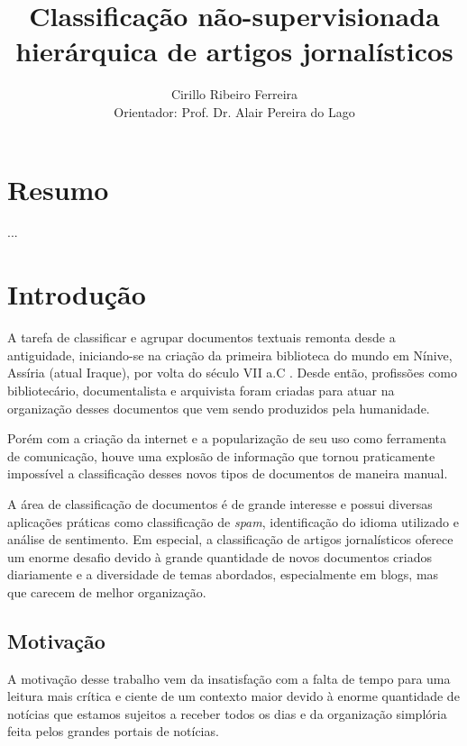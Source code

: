 \documentclass[a4paper,12pt]{article}
\title{Classificação não-supervisionada hierárquica de artigos jornalísticos}
\author{Cirillo Ribeiro Ferreira \\ Orientador: Prof. Dr. Alair Pereira do Lago}
\begin{document}
\maketitle
\newpage

\section*{Resumo}
...

\newpage

\tableofcontents
\newpage
\section {Introdução}
A tarefa de classificar e agrupar documentos textuais remonta desde a antiguidade, iniciando-se na criação da primeira biblioteca do mundo em Nínive, Assíria (atual Iraque), por volta do século VII a.C \cite{redarterj}. Desde então, profissões como bibliotecário, documentalista e arquivista foram criadas para atuar na organização desses documentos que vem sendo produzidos pela humanidade.

Porém com a criação da internet e a popularização de seu uso como ferramenta de comunicação, houve uma explosão de informação que tornou praticamente impossível a classificação desses novos tipos de documentos de maneira manual.

A área de classificação de documentos é de grande interesse e possui diversas aplicações práticas como classificação de \textit{spam}, identificação do idioma utilizado e análise de sentimento. Em especial, a classificação de artigos jornalísticos oferece um enorme desafio devido à grande quantidade de novos documentos criados diariamente e a diversidade de temas abordados, especialmente em blogs, mas que carecem de melhor organização.

\subsection{Motivação}
\label{sec:motivacao}

A motivação desse trabalho vem da insatisfação com a falta de tempo para uma leitura mais crítica e ciente de um contexto maior devido à enorme quantidade de notícias que estamos sujeitos a receber todos os dias e da organização simplória feita pelos grandes portais de notícias.
\end{document}
